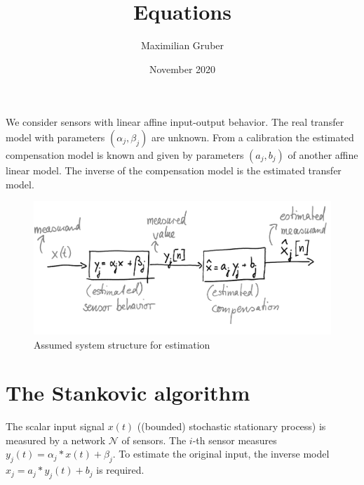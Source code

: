 \documentclass[10pt,a4paper,onecolumn]{article}
\title{Equations}
\author{Maximilian Gruber}    %
\date{November 2020}
\begin{document}
    \maketitle
    We consider sensors with linear affine input-output behavior. The real transfer model with parameters $(\alpha_j, \beta_j)$ are unknown. From a calibration the estimated compensation model is known and given by parameters $(a_j, b_j)$ of another affine linear model. The inverse of the compensation model is the estimated transfer model. 
    \begin{figure}[h]
        \centering
        \includegraphics[width=0.9\linewidth]{system_description.png}
        \caption{Assumed system structure for estimation}
        \label{fig:system_description}
    \end{figure}
    
    \section{The Stankovic algorithm}
    The scalar input signal $x(t)$ ((bounded) stochastic stationary process) is measured by a network $\mathcal{N}$ of sensors. The $i$-th sensor measures $y_j(t) = \alpha_j * x(t) + \beta_j$. To estimate the original input, the inverse model $\hat{x}_j = a_j * y_j(t) + b_j$ is required. 
    
\end{document}
